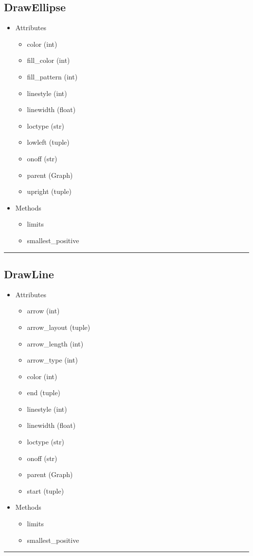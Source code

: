 \documentclass[10pt]{article}
\begin{document}
\begin{multicols}{4}
\subsection*{\footnotesize DrawEllipse}
\begin{itemize}
\item Attributes
\begin{itemize}
\item color (int)
\item fill\_color (int)
\item fill\_pattern (int)
\item linestyle (int)
\item linewidth (float)
\item loctype (str)
\item lowleft (tuple)
\item onoff (str)
\item parent (Graph)
\item upright (tuple)
\end{itemize}
\item Methods
\begin{itemize}
\item limits
\item smallest\_positive
\end{itemize}
\end{itemize}
\vspace{0.5em}
\hrule
\vspace{0.1em}
\subsection*{\footnotesize DrawLine}
\begin{itemize}
\item Attributes
\begin{itemize}
\item arrow (int)
\item arrow\_layout (tuple)
\item arrow\_length (int)
\item arrow\_type (int)
\item color (int)
\item end (tuple)
\item linestyle (int)
\item linewidth (float)
\item loctype (str)
\item onoff (str)
\item parent (Graph)
\item start (tuple)
\end{itemize}
\item Methods
\begin{itemize}
\item limits
\item smallest\_positive
\end{itemize}
\end{itemize}
\vspace{0.5em}
\hrule
\vspace{0.1em}

\end{multicols}
\end{document}

